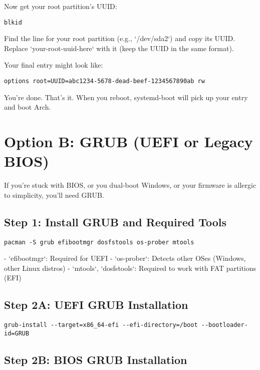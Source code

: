 \documentclass[12pt]{book}
\begin{document}
Now get your root partition’s UUID:

\begin{lstlisting}
blkid
\end{lstlisting}

Find the line for your root partition (e.g., `/dev/sda2`) and copy its UUID. Replace `your-root-uuid-here` with it (keep the UUID in the same format).

Your final entry might look like:

\begin{lstlisting}
options root=UUID=abc1234-5678-dead-beef-1234567890ab rw
\end{lstlisting}

You’re done. That’s it. When you reboot, systemd-boot will pick up your entry and boot Arch.

\section{Option B: GRUB (UEFI or Legacy BIOS)}

If you’re stuck with BIOS, or you dual-boot Windows, or your firmware is allergic to simplicity, you’ll need GRUB.

\subsection*{Step 1: Install GRUB and Required Tools}

\begin{lstlisting}
pacman -S grub efibootmgr dosfstools os-prober mtools
\end{lstlisting}

- `efibootmgr`: Required for UEFI
- `os-prober`: Detects other OSes (Windows, other Linux distros)
- `mtools`, `dosfstools`: Required to work with FAT partitions (EFI)

\subsection*{Step 2A: UEFI GRUB Installation}

\begin{lstlisting}
grub-install --target=x86_64-efi --efi-directory=/boot --bootloader-id=GRUB
\end{lstlisting}

\subsection*{Step 2B: BIOS GRUB Installation}
\end{document}
